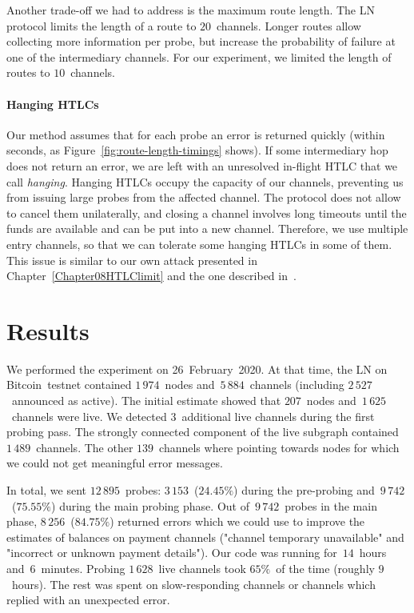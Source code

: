 Another trade-off we had to address is the maximum route length.
The LN protocol limits the length of a route to $20$~channels.
Longer routes allow collecting more information per probe, but increase the probability of failure at one of the intermediary channels.
For our experiment, we limited the length of routes to $10$~channels.

\paragraph{Hanging HTLCs}
Our method assumes that for each probe an error is returned quickly (within seconds, as Figure~\ref{fig:route-length-timings} shows).
If some intermediary hop does not return an error, we are left with an unresolved in-flight HTLC that we call \textit{hanging}.
Hanging HTLCs occupy the capacity of our channels, preventing us from issuing large probes from the affected channel.
The protocol does not allow to cancel them unilaterally, and closing a channel involves long timeouts until the funds are available and can be put into a new channel.
Therefore, we use multiple entry channels, so that we can tolerate some hanging HTLCs in some of them.
This issue is similar to our own attack presented in Chapter~\ref{Chapter08HTLClimit} and the one described in~\cite{Mizrahi2020}.


\section{Results} \label{sec:results}

We performed the experiment on 26~February~2020.
At that time, the LN on Bitcoin~testnet contained $1\,974$~nodes and~$5\,884$~channels (including $2\,527$~announced as active).
The initial estimate showed that $207$~nodes and~$1\,625$~channels were live.
We detected $3$~additional live channels during the first probing pass.
The strongly connected component of the live subgraph contained $1\,489$~channels.
The other $139$~channels where pointing towards nodes for which we could not get meaningful error messages.

In total, we sent $12\,895$~probes: $3\,153$~($24.45\%$) during the pre-probing and~$9\,742$~($75.55\%$) during the main probing phase.
Out of~$9\,742$~probes in the main phase, $8\,256$~($84.75\%$) returned errors which we could use to improve the estimates of balances on payment channels ("channel temporary unavailable" and "incorrect or unknown payment details").
Our code was running for~$14$~hours and~$6$~minutes. %
Probing $1\,628$~live channels took $65\%$~of the time (roughly $9$~hours).
The rest was spent on slow-responding channels or channels which replied with an unexpected error.



